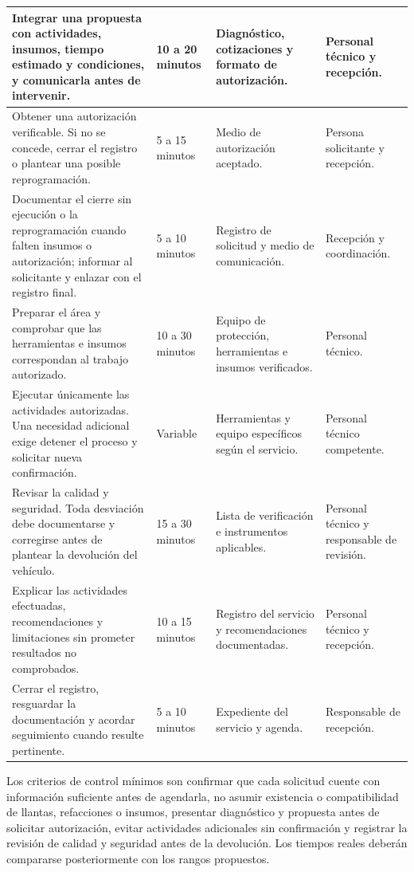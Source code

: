{\begin{longtable}{|p{}|p{}|p{}|p{}|}
\hline
Integrar una propuesta con actividades, insumos, tiempo estimado y condiciones, y comunicarla antes de intervenir. & 10 a 20 minutos & Diagnóstico, cotizaciones y formato de autorización. & Personal técnico y recepción. \\
\hline
Obtener una autorización verificable. Si no se concede, cerrar el registro o plantear una posible reprogramación. & 5 a 15 minutos & Medio de autorización aceptado. & Persona solicitante y recepción. \\
\hline
Documentar el cierre sin ejecución o la reprogramación cuando falten insumos o autorización; informar al solicitante y enlazar con el registro final. & 5 a 10 minutos & Registro de solicitud y medio de comunicación. & Recepción y coordinación. \\
\hline
Preparar el área y comprobar que las herramientas e insumos correspondan al trabajo autorizado. & 10 a 30 minutos & Equipo de protección, herramientas e insumos verificados. & Personal técnico. \\
\hline
Ejecutar únicamente las actividades autorizadas. Una necesidad adicional exige detener el proceso y solicitar nueva confirmación. & Variable & Herramientas y equipo específicos según el servicio. & Personal técnico competente. \\
\hline
Revisar la calidad y seguridad. Toda desviación debe documentarse y corregirse antes de plantear la devolución del vehículo. & 15 a 30 minutos & Lista de verificación e instrumentos aplicables. & Personal técnico y responsable de revisión. \\
\hline
Explicar las actividades efectuadas, recomendaciones y limitaciones sin prometer resultados no comprobados. & 10 a 15 minutos & Registro del servicio y recomendaciones documentadas. & Personal técnico y recepción. \\
\hline
Cerrar el registro, resguardar la documentación y acordar seguimiento cuando resulte pertinente. & 5 a 10 minutos & Expediente del servicio y agenda. & Responsable de recepción. \\
\hline
\end{longtable}

Los criterios de control mínimos son confirmar que cada solicitud cuente con información suficiente antes de agendarla, no asumir existencia o compatibilidad de llantas, refacciones o insumos, presentar diagnóstico y propuesta antes de solicitar autorización, evitar actividades adicionales sin confirmación y registrar la revisión de calidad y seguridad antes de la devolución. Los tiempos reales deberán compararse posteriormente con los rangos propuestos.

}
